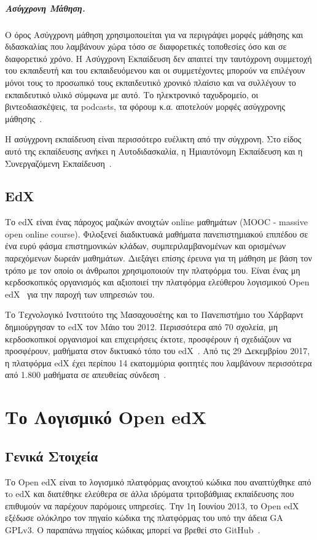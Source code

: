 \documentclass[12pt]{report}
\begin{document}
  \paragraph{Ασύγχρονη Μάθηση.} Ο όρος Ασύγχρονη μάθηση χρησιμοποιείται για να περιγράψει μορφές μάθησης και διδασκαλίας που λαμβάνουν χώρα τόσο σε διαφορετικές τοποθεσίες όσο και σε διαφορετικό χρόνο. Η Ασύγχρονη Εκπαίδευση δεν απαιτεί την ταυτόχρονη συμμετοχή του εκπαιδευτή και του εκπαιδευόμενου και οι συμμετέχοντες μπορούν να επιλέγουν μόνοι τους το προσωπικό τους εκπαιδευτικό χρονικό πλαίσιο και να συλλέγουν το εκπαιδευτικό υλικό σύμφωνα με αυτό. Το ηλεκτρονικό ταχυδρομείο, οι βιντεοδιασκέψεις, τα \textlatin{podcasts}, τα φόρουμ κ.α. αποτελούν μορφές ασύγχρονης μάθησης~\cite{hrastinski}.

Η ασύγχρονη εκπαίδευση είναι περισσότερο ευέλικτη από την σύγχρονη. Στο είδος αυτό της εκπαίδευσης ανήκει η Αυτοδιδασκαλία, η Ημιαυτόνομη Εκπαίδευση και η Συνεργαζόμενη Εκπαίδευση~\cite{wikipedia_2018_1}.

\section{\textlatin{EdX}}
Το \textlatin{edX} είναι ένας πάροχος μαζικών ανοιχτών \textlatin{online} μαθημάτων (\textlatin{MOOC - massive open online course}). Φιλοξενεί διαδικτυακά μαθήματα πανεπιστημιακού επιπέδου σε ένα ευρύ φάσμα επιστημονικών κλάδων, συμπεριλαμβανομένων και ορισμένων παρεχόμενων δωρεάν μαθημάτων. Διεξάγει επίσης έρευνα για τη μάθηση με βάση τον τρόπο με τον οποίο οι άνθρωποι χρησιμοποιούν την πλατφόρμα του. Είναι ένας μη κερδοσκοπικός οργανισμός και αξιοποιεί την πλατφόρμα ελεύθερου λογισμικού \textlatin{Open edX}~\cite{edx_2018} για την παροχή των υπηρεσιών του.

Το Τεχνολογικό Ινστιτούτο της Μασαχουσέτης και το Πανεπιστήμιο του Χάρβαρντ δημιούργησαν το \textlatin{edX} τον Μάιο του 2012. Περισσότερα από 70 σχολεία, μη κερδοσκοπικοί οργανισμοί και επιχειρήσεις έκτοτε, προσφέρουν ή σχεδιάζουν να προσφέρουν, μαθήματα στον δικτυακό τόπο του \textlatin{edX}~\cite{edx_2019_1}. Από τις 29 Δεκεμβρίου 2017, η πλατφόρμα \textlatin{edX} έχει περίπου 14 εκατομμύρια φοιτητές που λαμβάνουν περισσότερα από 1.800 μαθήματα σε απευθείας σύνδεση~\cite{report_2018}.


\chapter{Το Λογισμικό \textlatin{Open edX}}\label{ch2}
\section{Γενικά Στοιχεία}
Το \textlatin{Open edX} είναι το λογισμικό πλατφόρμας ανοιχτού κώδικα που αναπτύχθηκε από τo \textlatin{edX} και διατέθηκε ελεύθερα σε άλλα ιδρύματα τριτοβάθμιας εκπαίδευσης που επιθυμούν να παρέχουν παρόμοιες υπηρεσίες. Την 1η Ιουνίου 2013, το \textlatin{Open edX} εξέδωσε ολόκληρο τον πηγαίο κώδικα της πλατφόρμας του υπό την άδεια \textlatin{GA GPLv3}. Ο παραπάνω πηγαίος κώδικας μπορεί να βρεθεί στο \textlatin{GitHub}~\cite{edx_2019_2}.
\end{document}
